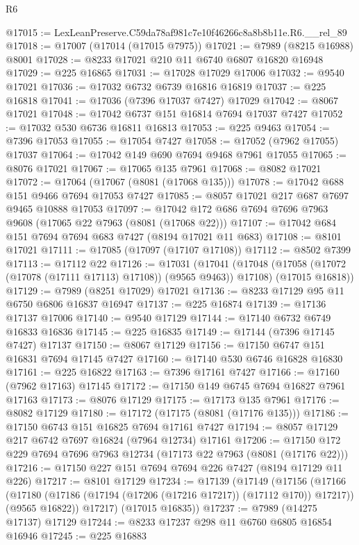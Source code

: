 \begin{lexlean}{R6}
\begin{coremodule}
@17015 := LexLeanPreserve.C59da78af981c7e10f46266c8a8b8b11e.R6.__rel_89
@17018 := @17007 (@17014 (@17015 @7975))
@17021 := @7989 (@8215 @16988) @8001
@17028 := @8233 @17021 @210 @11 @6740 @6807 @16820 @16948
@17029 := @225 @16865
@17031 := @17028 @17029 @17006
@17032 := @9540 @17021
@17036 := @17032 @6732 @6739 @16816 @16819
@17037 := @225 @16818
@17041 := @17036 (@7396 @17037 @7427) @17029
@17042 := @8067 @17021
@17048 := @17042 @6737 @151 @16814 @7694 @17037 @7427
@17052 := @17032 @530 @6736 @16811 @16813
@17053 := @225 @9463
@17054 := @7396 @17053
@17055 := @17054 @7427
@17058 := @17052 (@7962 @17055) @17037
@17064 := @17042 @149 @690 @7694 @9468 @7961 @17055
@17065 := @8076 @17021
@17067 := @17065 @135 @7961
@17068 := @8082 @17021
@17072 := @17064 (@17067 (@8081 (@17068 @135)))
@17078 := @17042 @688 @151 @9466 @7694 @17053 @7427
@17085 := @8057 @17021 @217 @687 @7697 @9465 @10888 @17053
@17097 := @17042 @172 @686 @7694 @7696 @7963 @9608 (@17065 @22 @7963 (@8081 (@17068 @22)))
@17107 := @17042 @684 @151 @7694 @7694 @683 @7427 (@8194 @17021 @11 @683)
@17108 := @8101 @17021
@17111 := @17085 (@17097 (@17107 @17108))
@17112 := @8502 @7399
@17113 := @17112 @22
@17126 := @17031
    (@17041
      (@17048 (@17058 (@17072 (@17078 (@17111 @17113) @17108)) (@9565 @9463)) @17108)
      (@17015 @16818))
@17129 := @7989 (@8251 @17029) @17021
@17136 := @8233 @17129 @95 @11 @6750 @6806 @16837 @16947
@17137 := @225 @16874
@17139 := @17136 @17137 @17006
@17140 := @9540 @17129
@17144 := @17140 @6732 @6749 @16833 @16836
@17145 := @225 @16835
@17149 := @17144 (@7396 @17145 @7427) @17137
@17150 := @8067 @17129
@17156 := @17150 @6747 @151 @16831 @7694 @17145 @7427
@17160 := @17140 @530 @6746 @16828 @16830
@17161 := @225 @16822
@17163 := @7396 @17161 @7427
@17166 := @17160 (@7962 @17163) @17145
@17172 := @17150 @149 @6745 @7694 @16827 @7961 @17163
@17173 := @8076 @17129
@17175 := @17173 @135 @7961
@17176 := @8082 @17129
@17180 := @17172 (@17175 (@8081 (@17176 @135)))
@17186 := @17150 @6743 @151 @16825 @7694 @17161 @7427
@17194 := @8057 @17129 @217 @6742 @7697 @16824 (@7964 @12734) @17161
@17206 := @17150 @172 @229 @7694 @7696 @7963 @12734 (@17173 @22 @7963 (@8081 (@17176 @22)))
@17216 := @17150 @227 @151 @7694 @7694 @226 @7427 (@8194 @17129 @11 @226)
@17217 := @8101 @17129
@17234 := @17139
    (@17149
      (@17156
        (@17166
          (@17180 (@17186 (@17194 (@17206 (@17216 @17217)) (@17112 @170)) @17217))
          (@9565 @16822))
        @17217)
      (@17015 @16835))
@17237 := @7989 (@14275 @17137) @17129
@17244 := @8233 @17237 @298 @11 @6760 @6805 @16854 @16946
@17245 := @225 @16883

\end{coremodule}
\end{lexlean}
